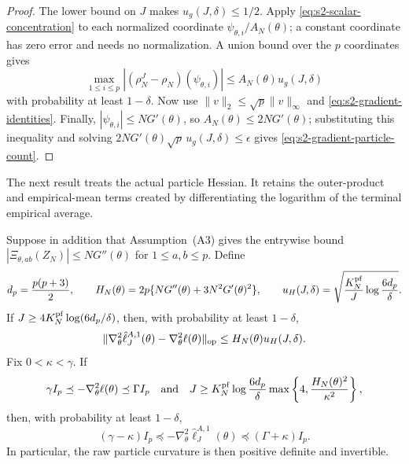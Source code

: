 \documentclass[11pt]{article}
\newcommand\refAssumpBoundedMeasurement{(A3)} %
\theoremstyle{thmstylethree}%
\begin{document}
\begin{proof}
The lower bound on $J$ makes $u_g(J,\delta)\leq1/2$.  Apply
\eqref{eq:s2-scalar-concentration} to each normalized coordinate
$\psi_{\theta,i}/A_N(\theta)$; a constant coordinate has zero error and needs
no normalization.  A union bound over the $p$ coordinates gives
\begin{equation*}
\max_{1\leq i\leq p}
 |(\rho_N^J-\rho_N)(\psi_{\theta,i})|
 \leq A_N(\theta)u_g(J,\delta)
\end{equation*}
with probability at least $1-\delta$.  Now use
$\|v\|_2\leq\sqrt p\|v\|_\infty$ and
\eqref{eq:s2-gradient-identities}.  Finally,
$|\psi_{\theta,i}|\leq NG'(\theta)$, so
$A_N(\theta)\leq2NG'(\theta)$; substituting this inequality and solving
$2NG'(\theta)\sqrt p\,u_g(J,\delta)\leq\epsilon$ gives
\eqref{eq:s2-gradient-particle-count}.
\end{proof}

The next result treats the actual particle Hessian.  It retains the
outer-product and empirical-mean terms created by differentiating the logarithm
of the terminal empirical average.

\begin{lem}
\label{lemma:hess_bound}
Suppose in addition that Assumption~{\refAssumpBoundedMeasurement} gives the
entrywise bound
\(
|\Xi_{\theta,ab}(Z_N)|\leq NG''(\theta)
\)
for $1\leq a,b\leq p$.  Define
\begin{equation}
d_p=\frac{p(p+3)}2,\qquad
H_N(\theta)=2p\{NG''(\theta)+3N^2G'(\theta)^2\},\qquad
u_H(J,\delta)=
 \sqrt{\frac{K_N^{\rm pf}}{J}\log\frac{6d_p}{\delta}}.         \label{eq:s2-hessian-constants}
\end{equation}
If $J\geq4K_N^{\rm pf}\log(6d_p/\delta)$, then, with probability at least
$1-\delta$,
\begin{equation}
\|\nabla_\theta^2\hat\ell_J^{A,1}(\theta)
      -\nabla_\theta^2\ell(\theta)\|_{\rm op}
\leq H_N(\theta)u_H(J,\delta).                                 \label{eq:s2-hessian-concentration}
\end{equation}
Fix $0<\kappa<\gamma$.  If
\begin{equation}
\gamma I_p\preceq-\nabla_\theta^2\ell(\theta)\preceq\Gamma I_p
\quad\hbox{and}\quad
J\geq K_N^{\rm pf}\log\frac{6d_p}{\delta}
 \max\left\{4,\frac{H_N(\theta)^2}{\kappa^2}\right\},       \label{eq:s2-hessian-particle-count}
\end{equation}
then, with probability at least $1-\delta$,
\begin{equation}
(\gamma-\kappa)I_p
 \preceq-\nabla_\theta^2\hat\ell_J^{A,1}(\theta)
 \preceq(\Gamma+\kappa)I_p.                                  \label{eq:s2-hessian-eigenvalues}
\end{equation}
In particular, the raw particle curvature is then positive definite and
invertible.
\end{lem}
\end{document}
